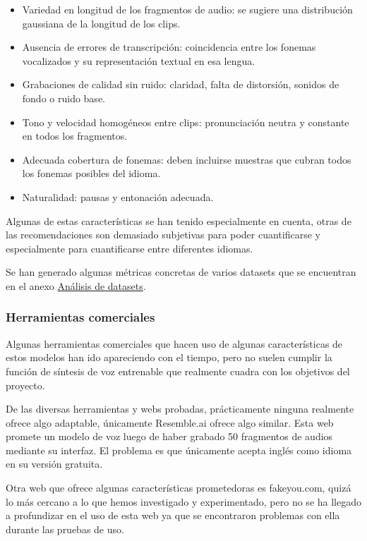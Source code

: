 \begin{itemize}
    \item Variedad en longitud de los fragmentos de audio: se sugiere una distribución gaussiana de la longitud de los clips.
    \item Ausencia de errores de transcripción: coincidencia entre los fonemas vocalizados y su representación textual en esa lengua.
    \item Grabaciones de calidad sin ruido: claridad, falta de distorsión, sonidos de fondo o ruido base.
    \item Tono y velocidad homogéneos entre clips: pronunciación neutra y constante en todos los fragmentos.
    \item Adecuada cobertura de fonemas: deben incluirse muestras que cubran todos los fonemas posibles del idioma.
    \item Naturalidad: pausas y entonación adecuada.
\end{itemize}

Algunas de estas características se han tenido especialmente en cuenta, otras de las recomendaciones son demasiado subjetivas para poder cuantificarse y especialmente para cuantificarse entre diferentes idiomas.

Se han generado algunas métricas concretas de varios datasets que se encuentran en el anexo \hyperref[Análisis de datasets]{Análisis de datasets}.

\subsubsection{Herramientas comerciales}

Algunas herramientas comerciales que hacen uso de algunas características de estos modelos han ido apareciendo con el tiempo, pero no suelen cumplir la función de síntesis de voz entrenable que realmente cuadra con los objetivos del proyecto.

De las diversas herramientas y webs probadas, prácticamente ninguna realmente ofrece algo adaptable, únicamente Resemble.ai ofrece algo similar. Esta web promete un modelo de voz luego de haber grabado 50 fragmentos de audios mediante su interfaz. El problema es que únicamente acepta inglés como idioma en su versión gratuita.

Otra web que ofrece algunas características prometedoras es fakeyou.com, quizá lo más cercano a lo que hemos investigado y experimentado, pero no se ha llegado a profundizar en el uso de esta web ya que se encontraron problemas con ella durante las pruebas de uso. 

